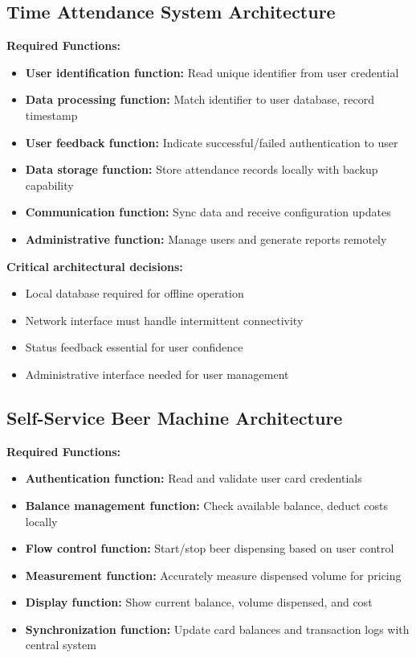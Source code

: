 \subsection{Time Attendance System Architecture}

\textbf{Required Functions:}
\begin{itemize}
\item \textbf{User identification function:} Read unique identifier from user credential
\item \textbf{Data processing function:} Match identifier to user database, record timestamp
\item \textbf{User feedback function:} Indicate successful/failed authentication to user
\item \textbf{Data storage function:} Store attendance records locally with backup capability
\item \textbf{Communication function:} Sync data and receive configuration updates
\item \textbf{Administrative function:} Manage users and generate reports remotely
\end{itemize}

\textbf{Critical architectural decisions:}
\begin{itemize}
\item Local database required for offline operation
\item Network interface must handle intermittent connectivity
\item Status feedback essential for user confidence
\item Administrative interface needed for user management
\end{itemize}

\subsection{Self-Service Beer Machine Architecture}

\textbf{Required Functions:}
\begin{itemize}
\item \textbf{Authentication function:} Read and validate user card credentials
\item \textbf{Balance management function:} Check available balance, deduct costs locally
\item \textbf{Flow control function:} Start/stop beer dispensing based on user control
\item \textbf{Measurement function:} Accurately measure dispensed volume for pricing
\item \textbf{Display function:} Show current balance, volume dispensed, and cost
\item \textbf{Synchronization function:} Update card balances and transaction logs with central system
\end{itemize}

